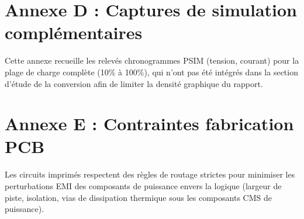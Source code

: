 \section*{Annexe D : Captures de simulation complémentaires}
Cette annexe recueille les relevés chronogrammes PSIM (tension, courant) pour la plage de charge complète (10\% à 100\%), qui n'ont pas été intégrés dans la section d'étude de la conversion afin de limiter la densité graphique du rapport.

\section*{Annexe E : Contraintes fabrication PCB}
Les circuits imprimés respectent des règles de routage strictes pour minimiser les perturbations EMI des composants de puissance envers la logique (largeur de piste, isolation, vias de dissipation thermique sous les composants CMS de puissance).

